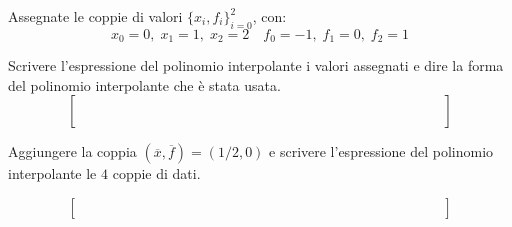 Assegnate le coppie di valori $\{x_i,f_i \}_{i=0}^2$, con: 
\[ 
x_0=0, \; x_1=1, \; x_2=2 \quad f_0=-1, \; f_1=0, \; f_2=1 
\]

\noindent Scrivere l'espressione del polinomio interpolante i 
valori assegnati e dire la forma del polinomio interpolante che \`{e} stata usata.
\[
\left [
\begin{array}{cccccccccccccc}
 \quad &  \quad & \quad &  \quad &  \quad &  \quad &  \quad  \quad & \quad &  \quad & \quad &  \quad & \quad & \quad &  \quad  \\
 \quad & \quad & \quad &  \quad &  \quad &  \quad &  \quad  \quad & \quad &  \quad & \quad &  \quad & \quad & \quad &  \quad \\
 \quad & \quad & \quad &  \quad &  \quad &  \quad &  \quad  \quad & \quad &  \quad & \quad &  \quad & \quad & \quad &  \quad\\
   \quad &  \quad & \quad &  \quad &  \quad &  \quad &  \quad  \quad & \quad &  \quad & \quad &  \quad & \quad & \quad &  \quad  \\
  \quad &  \quad & \quad &  \quad &  \quad &  \quad &  \quad  \quad & \quad &  \quad & \quad &  \quad & \quad & \quad &  \quad  
\end{array}\right]
\]
\medskip

\noindent
Aggiungere la coppia $(\overline{x},\overline{f})=(1/2,0)$ e 
scrivere l'espressione del polinomio interpolante le $4$ coppie 
di dati.

\[\left [
\begin{array}{cccccccccccccc}
 \quad &  \quad & \quad &  \quad &  \quad &  \quad &  \quad  \quad & \quad &  \quad & \quad &  \quad & \quad & \quad &  \quad  \\
 \quad & \quad & \quad &  \quad &  \quad &  \quad &  \quad  \quad & \quad &  \quad & \quad &  \quad & \quad & \quad &  \quad \\
 \quad & \quad & \quad &  \quad &  \quad &  \quad &  \quad  \quad & \quad &  \quad & \quad &  \quad & \quad & \quad &  \quad
\end{array}\right]
\]
